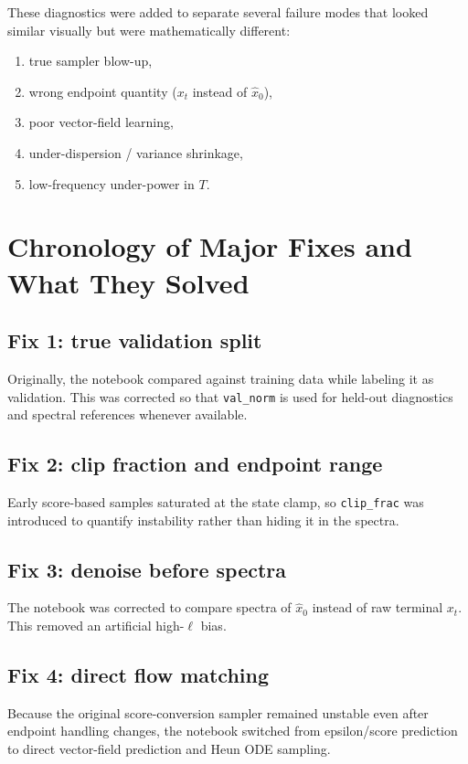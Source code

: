 \documentclass[11pt]{article}
\begin{document}
These diagnostics were added to separate several failure modes that looked similar visually but were mathematically different:
\begin{enumerate}[leftmargin=1.5em]
  \item true sampler blow-up,
  \item wrong endpoint quantity (\(x_t\) instead of \(\hat x_0\)),
  \item poor vector-field learning,
  \item under-dispersion / variance shrinkage,
  \item low-frequency under-power in \(T\).
\end{enumerate}

\section{Chronology of Major Fixes and What They Solved}

\subsection{Fix 1: true validation split}

Originally, the notebook compared against training data while labeling it as validation. This was corrected so that \texttt{val\_norm} is used for held-out diagnostics and spectral references whenever available.

\subsection{Fix 2: clip fraction and endpoint range}

Early score-based samples saturated at the state clamp, so \texttt{clip\_frac} was introduced to quantify instability rather than hiding it in the spectra.

\subsection{Fix 3: denoise before spectra}

The notebook was corrected to compare spectra of \(\hat x_0\) instead of raw terminal \(x_t\). This removed an artificial high-\(\ell\) bias.

\subsection{Fix 4: direct flow matching}

Because the original score-conversion sampler remained unstable even after endpoint handling changes, the notebook switched from epsilon/score prediction to direct vector-field prediction and Heun ODE sampling.
\end{document}
